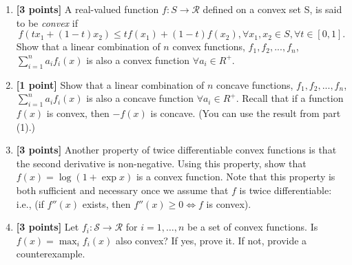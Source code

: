\begin{enumerate}
    \item \textbf{[3 points]} A real-valued function $f:S \rightarrow \mathcal{R}$ defined on a convex set S, is said to be \textit{convex} if $$f(tx_{1}+(1-t)x_{2})\leq tf(x_{1})+(1-t)f(x_{2}), \forall x_{1},x_{2}\in S,\forall t\in [0,1].$$
    Show that a linear combination of $n$ convex functions, $f_1, f_2,...,f_n$, $\sum_{i=1}^n a_if_i(x)$ is also a convex function  $\forall a_i \in R^+$. 


\begin{tcolorbox}[fit,height=7cm,width=.95\textwidth,blank,borderline={1pt}{-2pt},nobeforeafter]

\end{tcolorbox}

\clearpage
\item \textbf{[1 point]} Show that a linear combination of $n$ concave functions, $f_1, f_2,...,f_n$, $\sum_{i=1}^n a_if_i(x)$ is also a concave function  $\forall a_i \in R^+$. Recall that if a function $f(x)$ is convex, then $-f(x)$ is concave. (You can use the result from part (1).) 
    

\begin{tcolorbox}[fit,height=7cm,width=.95\textwidth,blank,borderline={1pt}{-2pt},nobeforeafter]

\end{tcolorbox}
  
\item \textbf{[3 points]} Another property of twice differentiable convex functions is that the second derivative is non-negative. Using this property, show that $f (x) = \log (1 + \exp x)$ is a convex function. Note that this property is both sufficient and necessary once we assume that $f$ is twice differentiable: i.e., (if $f''(x)$ exists, then $f''(x)\ge 0 \iff  f$ is convex).
    
\begin{tcolorbox}[fit,height=7cm,width=.95\textwidth,blank,borderline={1pt}{-2pt},nobeforeafter]

\end{tcolorbox}
\clearpage
\item \textbf{[3 points]} Let $f_i:\mathcal{S} \rightarrow \mathcal{R}$ for $i = 1, \ldots, n$ be a set of convex functions.
Is $f(x) = \max_i f_i(x)$ also convex?
If yes, prove it. 
If not, provide a counterexample.  


\begin{tcolorbox}[fit,height=6cm,width=.95\textwidth,blank,borderline={1pt}{-2pt},nobeforeafter]


\end{tcolorbox}
\end{enumerate}
